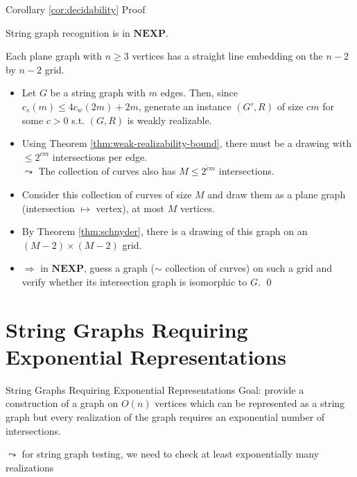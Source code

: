 \documentclass[10pt,aspectratio=169]{beamer}
\theoremstyle{plain}
\begin{document}
\addtocounter{theorem}{-2}
\begin{frame}[t]{Corollary \ref{cor:decidability} Proof}
    \begin{corollary}
        String graph recognition is in \(\mathbf{NEXP}\).
    \end{corollary}
    \begin{theorem}
        Each plane graph with \(n \geq 3\) vertices has a straight line embedding on the \(n-2\) by \(n-2\) grid.
        \label{thm:schnyder}
    \end{theorem}
    \begin{itemize}
        \item Let \(G\) be a string graph with \(m\) edges. \pause
        Then, since \(c_s(m) \leq 4 c_w(2m) + 2m\), generate an instance \((G', R)\) of size \(c m\) for some \(c > 0\) s.t.
        \((G, R)\) is weakly realizable.
        \item<3-> Using Theorem \ref{thm:weak-realizability-bound}, there must be a drawing with \(\leq 2^{cm}\) intersections per edge.\\
        \(\leadsto\) The collection of curves also has \(M \leq 2^{\tilde{c} m}\) intersections.
        \item<4-> Consider this collection of curves of size \(M\) and draw them as a plane graph \\(intersection \(\mapsto\) vertex), at most \(M\) vertices.
        \item<5-> By Theorem \ref{thm:schnyder}, there is a drawing of this graph on an \((M-2) \times (M-2)\) grid.
        \item<6-> \(\Rightarrow\) in \(\mathbf{NEXP}\), guess a graph (\(\sim\) collection of curves) on such a grid and verify whether its intersection graph is isomorphic to \(G\). \qed
    \end{itemize}
\end{frame}

\section{String Graphs Requiring Exponential Representations}

\begin{frame}{String Graphs Requiring Exponential Representations}
    Goal: provide a construction of a graph on \(O(n)\) vertices which can be represented
    as a string graph but every realization of the graph requires an exponential number of intersections.

    \(\leadsto\) for string graph testing, we need to check at least exponentially many realizations
\end{frame}
\end{document}
